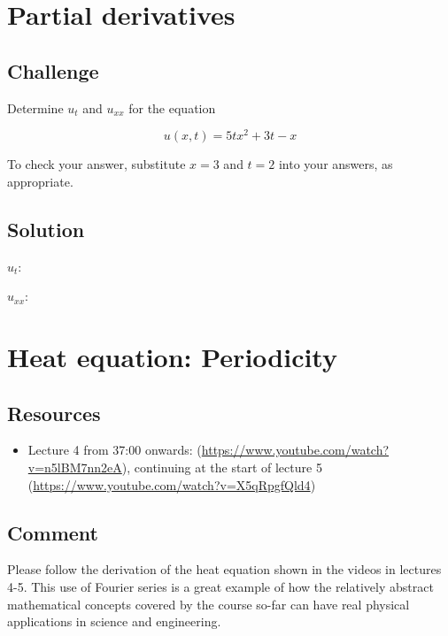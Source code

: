 \newpage
\section{Partial derivatives}

\subsection*{Challenge}
Determine $u_t$ and $u_{xx}$ for the equation

\begin{equation}
    u(x,t) = 5tx^2 + 3t - x
\end{equation}

To check your answer, substitute $x=3$ and $t=2$ into your answers, as appropriate.

\subsection*{Solution}
$u_t$: 

$u_{xx}$: 

\timebox




\newpage
\section{Heat equation: Periodicity}

\subsection*{Resources}
\begin{itemize}
    \item Lecture 4 from 37:00 onwards: (\url{https://www.youtube.com/watch?v=n5lBM7nn2eA}), continuing at the start of lecture 5 (\url{https://www.youtube.com/watch?v=X5qRpgfQld4})
\end{itemize}

\subsection*{Comment}
Please follow the derivation of the heat equation shown in the videos in lectures 4-5. This use of Fourier series is a great example of how the relatively abstract mathematical concepts covered by the course so-far can have real physical applications in science and engineering.

